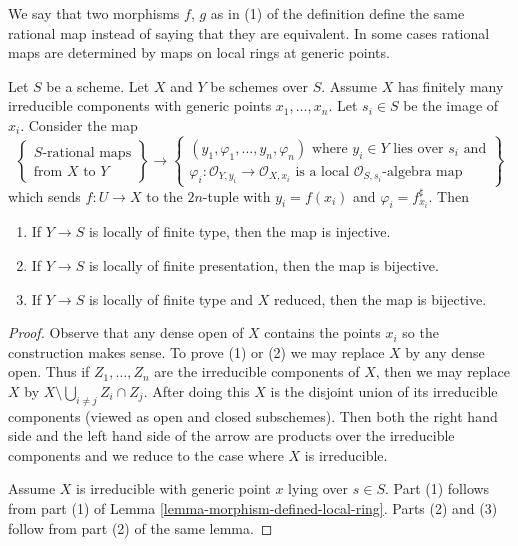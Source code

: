 \noindent
We say that two morphisms $f$, $g$ as in (1) of the definition
define the same rational map instead of saying that they are equivalent.
In some cases rational maps are determined by maps on local rings
at generic points.

\begin{lemma}
\label{lemma-rational-map-finite-presentation}
Let $S$ be a scheme. Let $X$ and $Y$ be schemes over $S$. Assume $X$ has
finitely many irreducible components with generic points
$x_1, \ldots, x_n$. Let $s_i \in S$ be the image of $x_i$.
Consider the map
$$
\left\{
\begin{matrix}
S\text{-rational maps} \\
\text{from }X\text{ to }Y
\end{matrix}
\right\}
\longrightarrow
\left\{
\begin{matrix}
(y_1, \varphi_1, \ldots, y_n, \varphi_n)\text{ where }
y_i \in Y\text{ lies over }s_i\text{ and}\\
\varphi_i : \mathcal{O}_{Y, y_i} \to \mathcal{O}_{X, x_i}
\text{ is a local }\mathcal{O}_{S, s_i}\text{-algebra map}
\end{matrix}
\right\}
$$
which sends $f : U \to X$ to the $2n$-tuple with
$y_i = f(x_i)$ and $\varphi_i = f^\sharp_{x_i}$. Then
\begin{enumerate}
\item If $Y \to S$ is locally of finite type, then the map is injective.
\item If $Y \to S$ is locally of finite presentation, then the map is bijective.
\item If $Y \to S$ is locally of finite type and $X$ reduced,
then the map is bijective.
\end{enumerate}
\end{lemma}

\begin{proof}
Observe that any dense open of $X$ contains the points $x_i$
so the construction makes sense. To prove (1) or (2)
we may replace $X$ by any dense open. Thus if $Z_1, \ldots, Z_n$
are the irreducible components of $X$, then we may replace
$X$ by $X \setminus \bigcup_{i \not = j} Z_i \cap Z_j$.
After doing this $X$ is the disjoint union of its irreducible
components (viewed as open and closed subschemes). Then both the
right hand side and the left hand side of the arrow are products
over the irreducible components and we reduce to the case where
$X$ is irreducible.

\medskip\noindent
Assume $X$ is irreducible with generic point $x$ lying over $s \in S$.
Part (1) follows from part (1) of
Lemma \ref{lemma-morphism-defined-local-ring}.
Parts (2) and (3) follow from part (2) of the same lemma.
\end{proof}


